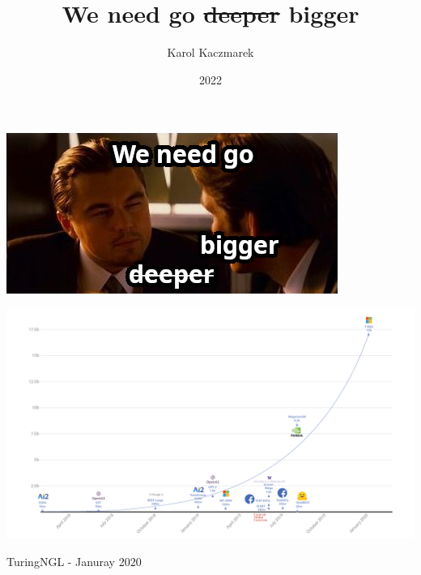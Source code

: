 \documentclass{beamer}
\title{We need go \sout{deeper} bigger}
\date{2022}
\author{Karol Kaczmarek}
\begin{document}
\begin{frame}
    \titlepage
\end{frame}

\begin{frame}
    \begin{center}
        \includegraphics[scale=3.25]{img/meme_we_need_go_deeper_bigger.png}
    \end{center}
\end{frame}

\begin{frame}
    \begin{center}
        \includegraphics[scale=0.245]{img/TurningNGL.png}
    \end{center}
    \tiny{TuringNGL - Januray 2020}
\end{frame}
\end{document}

